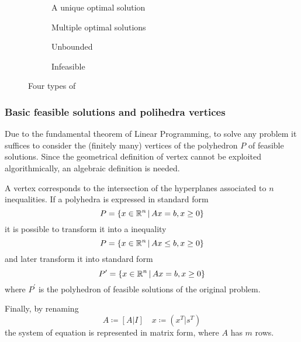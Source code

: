 \documentclass[english]{article}
\begin{document}
\begin{figure}[htbp]
  \bigskip
  \centering
  \begin{subfigure}[b]{0.495\textwidth}
    \bigskip
    \centering
    \caption{A unique optimal solution}
    \label{subfig:unique-solution}
    \bigskip
  \end{subfigure}
  \begin{subfigure}[b]{0.495\textwidth}
    \bigskip
    \centering
    \caption{Multiple optimal solutions}
    \label{subfig:multiple-solutions}
    \bigskip
  \end{subfigure}
  \bigskip
  \begin{subfigure}[b]{0.495\textwidth}
    \bigskip
    \centering
    \caption{Unbounded \LP}
    \label{subfig:unbounded-lp}
    \bigskip
  \end{subfigure}
  \begin{subfigure}[b]{0.495\textwidth}
    \bigskip
    \centering
    \caption{Infeasible \LP}
    \label{subfig:infeasible-lp}
    \bigskip
  \end{subfigure}
  \caption{Four types of \LP}
  \label{fig:lp-types}
  \bigskip
\end{figure}

\subsubsection{Basic feasible solutions and polihedra vertices}

Due to the fundamental theorem of Linear Programming, to solve any \LP problem it suffices to consider the (finitely many) vertices of the polyhedron \(P\) of feasible solutions.
Since the geometrical definition of vertex cannot be exploited algorithmically, an algebraic definition is needed.

A vertex corresponds to the intersection of the hyperplanes associated to \(n\) inequalities.
If a polyhedra is expressed in standard form
\[ P = \left\{ x \in \mathbb{R}^n \, | \, Ax = b, x \geq 0 \right\}\]
it is possible to transform it into a inequality
\[ P = \left\{ x \in \mathbb{R}^n \, | \, Ax \leq b, x \geq 0 \right\}\]
and later transform it into standard form
\[ P^\prime = \left\{ x \in \mathbb{R}^n \, | \, Ax = b, x \geq 0 \right\} \]
where \(P^\prime\) is the polyhedron of feasible solutions of the original problem.

Finally, by renaming
\[ A \coloneq \left[ A | I \right] \quad x \coloneq \left( x^T | s^T \right) \]
the system of equation is represented in matrix form, where \(A\) has \(m\) rows.
\end{document}
